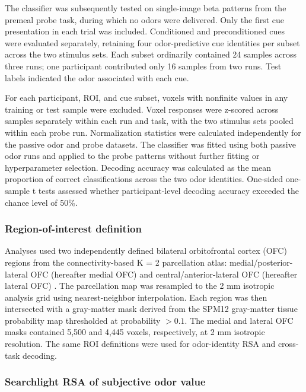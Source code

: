 \documentclass[9pt,twoside,lineno]{pnas-new}
\begin{document}
The classifier was subsequently tested on single-image beta patterns from the premeal probe task, during which no odors were delivered. Only the first cue presentation in each trial was included. Conditioned and preconditioned cues were evaluated separately, retaining four odor-predictive cue identities per subset across the two stimulus sets. Each subset ordinarily contained 24 samples across three runs; one participant contributed only 16 samples from two runs. Test labels indicated the odor associated with each cue.

For each participant, ROI, and cue subset, voxels with nonfinite values in any training or test sample were excluded. Voxel responses were z-scored across samples separately within each run and task, with the two stimulus sets pooled within each probe run. Normalization statistics were calculated independently for the passive odor and probe datasets. The classifier was fitted using both passive odor runs and applied to the probe patterns without further fitting or hyperparameter selection. Decoding accuracy was calculated as the mean proportion of correct classifications across the two odor identities. One-sided one-sample t tests assessed whether participant-level decoding accuracy exceeded the chance level of 50\%.

\subsubsection*{Region-of-interest definition}

Analyses used two independently defined bilateral orbitofrontal cortex (OFC) regions from the connectivity-based K = 2 parcellation atlas: medial/posterior-lateral OFC (hereafter medial OFC) and central/anterior-lateral OFC (hereafter lateral OFC) \cite{kahnt2012connectivity}. The parcellation map was resampled to the 2 mm isotropic analysis grid using nearest-neighbor interpolation. Each region was then intersected with a gray-matter mask derived from the SPM12 gray-matter tissue probability map thresholded at probability $>0.1$. The medial and lateral OFC masks contained 5,500 and 4,445 voxels, respectively, at 2 mm isotropic resolution. The same ROI definitions were used for odor-identity RSA and cross-task decoding.

\subsubsection*{Searchlight RSA of subjective odor value}
\end{document}
